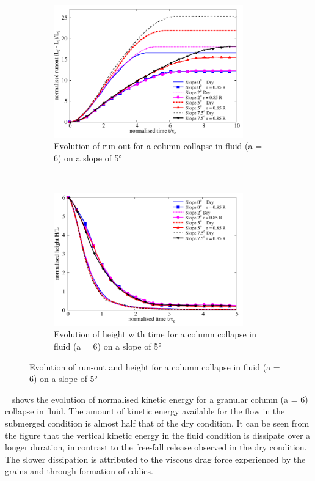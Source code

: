 \begin{figure}
\centering
\begin{subfigure}[t]{0.9\textwidth}
\includegraphics[width=0.9\textwidth]{Runout_a6_slope}
\caption{Evolution of run-out for a column collapse in fluid (a = 6) on a 
slope of 5\si{\degree}}
\label{fig:Runout_a6_slope}
\end{subfigure} \\
\begin{subfigure}[t]{0.9\textwidth}
\centering
\includegraphics[width=0.9\textwidth]{Height_a6_slope}
\caption{Evolution of height with time for a column collapse in fluid (a = 6) 
on a slope of 5\si{\degree}}
\label{fig:Height_a6_slope}
\end{subfigure}
\caption{Evolution of  run-out and height  for a column collapse in fluid (a = 
6) on a slope of 5\si{\degree}}
\label{fig:a6_slope}
\end{figure}

~ shows the evolution of normalised kinetic energy for a 
granular column (a = 6) collapse in fluid. The amount of kinetic energy 
available for the flow in the submerged condition 
is almost half that of the dry condition. It can be seen from the figure that 
the vertical kinetic energy in the fluid condition is dissipate over a longer 
duration, in contrast to the free-fall release observed in the dry condition. 
The slower dissipation is attributed to the viscous drag force experienced by 
the grains and through formation of eddies. 

